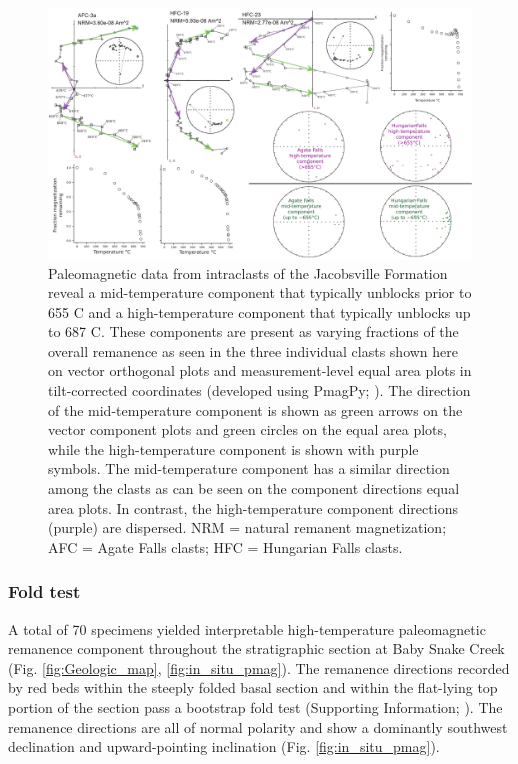 \documentclass[draft]{agujournal2019}
\begin{document}
\begin{figure}[h!]
\centering
\includegraphics[width=\textwidth]{Intraclast_pmag.pdf}
\caption{Paleomagnetic data from intraclasts of the Jacobsville Formation reveal a mid-temperature component that typically unblocks prior to 655 \textdegree C and a high-temperature component that typically unblocks up to 687 \textdegree C. These components are present as varying fractions of the overall remanence as seen in the three individual clasts shown here on vector orthogonal plots and measurement-level equal area plots in tilt-corrected coordinates (developed using PmagPy; ). The direction of the mid-temperature component is shown as green arrows on the vector component plots and green circles on the equal area plots, while the high-temperature component is shown with purple symbols. The mid-temperature component has a similar direction among the clasts as can be seen on the component directions equal area plots. In contrast, the high-temperature component directions (purple) are dispersed. NRM = natural remanent magnetization; AFC = Agate Falls clasts; HFC = Hungarian Falls clasts.}
\label{fig:Intraclast_pmag}
\end{figure}

\subsubsection*{Fold test}

A total of 70 specimens yielded interpretable high-temperature paleomagnetic remanence component throughout the stratigraphic section at Baby Snake Creek (Fig. \ref{fig:Geologic_map}, \ref{fig:in_situ_pmag}). The remanence directions recorded by red beds within the steeply folded basal section and within the flat-lying top portion of the section pass a bootstrap fold test (Supporting Information; ). The remanence directions are all of normal polarity and show a dominantly southwest declination and upward-pointing inclination (Fig. \ref{fig:in_situ_pmag}). 
\end{document}
